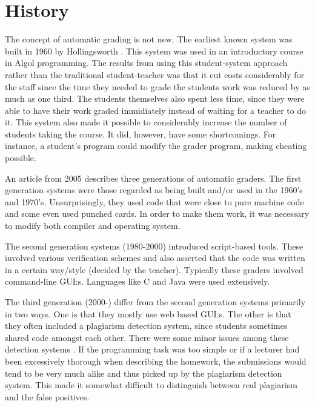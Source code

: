 \section{History}
The concept of automatic grading is not new. The earliest known system was built in 1960 by Hollingsworth \cite{Hollingsworth}. This system was used in an introductory course in Algol programming. The results from using this student-system approach rather than the traditional student-teacher was that it cut costs considerably for the staff since the time they needed to grade the students work was reduced by as much as one third. The students themselves also spent less time, since they were able to have their work graded immidiately instead of waiting for a teacher to do it. This system also made it possible to considerably increase the number of students taking the course. It did, however, have some shortcomings. For instance, a student's program could modify the grader program, making cheating possible. 

An article from 2005 \cite{GenerationReview} describes three generations of automatic graders. The first generation systems were those regarded as being built and/or used in the 1960's and 1970's. Unsurprisingly, they used code that were close to pure machine code and some even used punched cards. In order to make them work, it was necessary to modify both compiler and operating system. 

The second generation systems (1980-2000) introduced script-based tools. These involved various verification schemes and also asserted that the code was written in a certain way/style (decided by the teacher). Typically these graders involved command-line GUI:s. Languages like C and Java were used extensively.

The third generation (2000-) differ from the second generation systems primarily in two ways. One is that they mostly use web based GUI:s. The other is that they often included a plagiarism detection system, since students sometimes shared code amongst each other. There were some minor issues among these detection systems \cite{GenerationReview} \cite{Gradebot} . If the programming task was too simple or if a lecturer had been excessively thorough when describing the homework, the submissions would tend to be very much alike and thus picked up by the plagiarism detection system. This made it somewhat difficult to distinguish between real plagiarism and the false positives. 